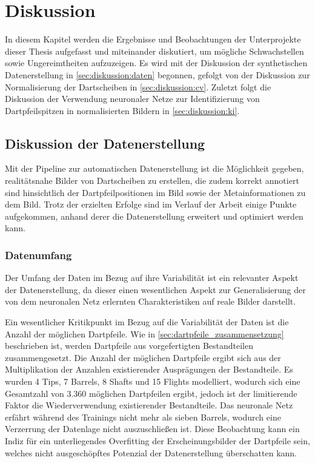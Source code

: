 
\chapter{Diskussion}
\label{cha:diskussion}

In diesem Kapitel werden die Ergebnisse und Beobachtungen der Unterprojekte dieser Thesis aufgefasst und miteinander diskutiert, um mögliche Schwachstellen sowie Ungereimtheiten aufzuzeigen. Es wird mit der Diskussion der synthetischen Datenerstellung in \autoref{sec:diskussion:daten} begonnen, gefolgt von der Diskussion zur Normalisierung der Dartscheiben in \autoref{sec:diskussion:cv}. Zuletzt folgt die Diskussion der Verwendung neuronaler Netze zur Identifizierung von Dartpfeilspitzen in normalisierten Bildern in \autoref{sec:diskussion:ki}.


\section{Diskussion der Datenerstellung}
\label{sec:diskussion:daten}

Mit der Pipeline zur automatischen Datenerstellung ist die Möglichkeit gegeben, realitätsnahe Bilder von Dartscheiben zu erstellen, die zudem korrekt annotiert sind hinsichtlich der Dartpfeilpositionen im Bild sowie der Metainformationen zu dem Bild. Trotz der erzielten Erfolge sind im Verlauf der Arbeit einige Punkte aufgekommen, anhand derer die Datenerstellung erweitert und optimiert werden kann.

\subsection{Datenumfang}

Der Umfang der Daten im Bezug auf ihre Variabilität ist ein relevanter Aspekt der Datenerstellung, da dieser einen wesentlichen Aspekt zur Generalisierung der von dem neuronalen Netz erlernten Charakteristiken auf reale Bilder darstellt.

Ein wesentlicher Kritikpunkt im Bezug auf die Variabilität der Daten ist die Anzahl der möglichen Dartpfeile. Wie in \autoref{sec:dartpfeile_zusammensetzung} beschrieben ist, werden Dartpfeile aus vorgefertigten Bestandteilen zusammengesetzt. Die Anzahl der möglichen Dartpfeile ergibt sich aus der Multiplikation der Anzahlen existierender Ausprägungen der Bestandteile. Es wurden 4 Tips, 7 Barrels, 8 Shafts und 15 Flights modelliert, wodurch sich eine Gesamtzahl von $3.360$ möglichen Dartpfeilen ergibt, jedoch ist der limitierende Faktor die Wiederverwendung existierender Bestandteile. Das neuronale Netz erfährt während des Trainings nicht mehr als sieben Barrels, wodurch eine Verzerrung der Datenlage nicht auszuschließen ist. Diese Beobachtung kann ein Indiz für ein unterliegendes Overfitting der Erscheinungsbilder der Dartpfeile sein, welches nicht ausgeschöpftes Potenzial der Datenerstellung überschatten kann.

